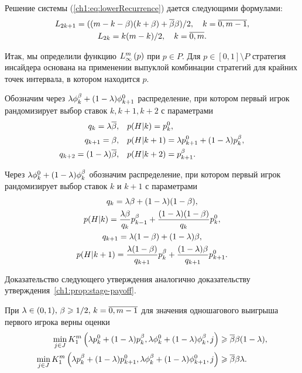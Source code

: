 {\begin{proposition}
  \label{ch1:prop:lower:recurrence-solution}
  Решение системы {\normalfont(\ref{ch1:eq:lowerRecurrence})} дается
  следующими формулами\textup{:}
  \begin{gather}
    \label{ch1:eq:recurrence-solution:odd}
    L_{2k+1} = ((m - k - \Co)(k + \Co) + \DCo\Co)/2, \quad k = \overline{0, m-1},\\
    \label{ch1:eq:recurrence-solution:even}
    L_{2k} = k (m-k)/2, \quad k = \overline{0, m}.
  \end{gather}
\end{proposition}

Итак, мы определили функцию $\lowerBound{p}$ при $p \in P$. Для %
$p \in [0, 1] \setminus P$ стратегия инсайдера основана на применении выпуклой
комбинации стратегий для крайних точек интервала, в котором находится $p$.

Обозначим через $\lambda\fOdd[k] + (1-\lambda)\fEven[k+1]$ распределение, при
котором первый игрок рандомизирует выбор ставок $k, k+1, k+2$ с параметрами
\begin{align*}
  q_k = \lambda\DCo, &\quad p(H|k) = \pEven,\\
  q_{k+1} = \Co, &\quad p(H|k+1) = \lambda \pEven[k+1] + (1-\lambda) \pOdd,\\
  q_{k+2} = (1-\lambda)\DCo, &\quad p(H|k+2) = \pOdd[k+1].
\end{align*}

Через $\lambda\fEven + (1-\lambda)\fOdd$ обозначим распределение, при котором
первый игрок рандомизирует выбор ставок $k$ и $k+1$ с параметрами
\begin{gather*}
  q_k = \lambda\Co + (1-\lambda)(1-\Co), \\
  p(H|k) = \frac{\lambda\Co}{q_k}\pOdd[k-1] + \frac{(1-\lambda)(1-\Co)}{q_k} \pEven,\\
  q_{k+1} = \lambda(1-\Co) + (1-\lambda)\Co, \\
  p(H|k+1) = \frac{\lambda(1-\Co)}{q_{k+1}}\pOdd[k] + \frac{(1-\lambda)\Co}{q_{k+1}}\pEven[k+1].
\end{gather*}

Доказательство следующего утверждения аналогично доказательству
утверждения~\ref{ch1:prop:stage-payoff}.
\begin{proposition}
  \label{ch1:prop:first:combination:step}
  При $\lambda \in (0, 1), \, \Co \geq 1/2, \, k = \overline{0, m-1}$ для
  значения одношагового выигрыша первого игрока верны оценки
  \begin{align*}
    \min_{j \in J}
    \firstPlayerPayoff{1}{%
    \lambda \pEven + (1-\lambda) \pOdd}{%
    \lambda \fEven + (1-\lambda) \fOdd}{%
    j}
    &\geq \DCo \Co (1-\lambda), \\
    \min_{j \in J}
    \firstPlayerPayoff{1}{%
    \lambda \pOdd + (1-\lambda) \pEven[k+1]}{%
    \lambda \fOdd + (1-\lambda) \fEven[k+1]}{%
    j}
    &\geq \DCo \Co \lambda.
  \end{align*}
\end{proposition}

}
